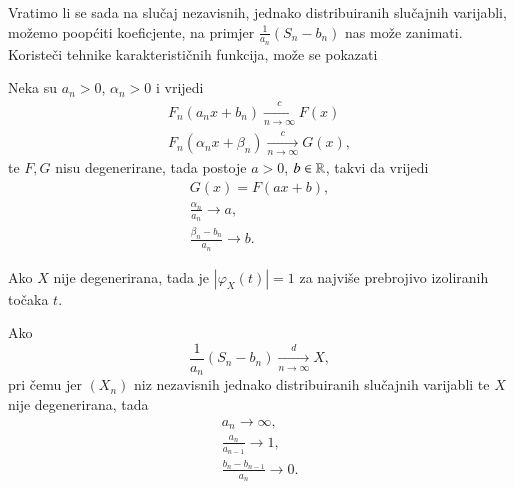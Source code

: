 Vratimo li se sada na slu\v caj nezavisnih, jednako distribuiranih slu\v cajnih varijabli, mo\v zemo poop\' citi koeficjente, na primjer $\frac{1}{a_n} (S_n - b_n)$ nas mo\v ze zanimati.
Koriste\v ci tehnike karakteristi\v cnih funkcija, mo\v ze se pokazati

\begin{zad} \label{zad:19.14}
    Neka su $a_n > 0$, $\alpha_n > 0$ i vrijedi
    \begin{equation*}
        \begin{aligned}
            F_n (a_n x + b_n) \xrightarrow[n \to \infty]{c} F(x)\\
            F_n (\alpha_n x + \beta_n) \xrightarrow[n \to \infty]{c} G(x),
        \end{aligned}
    \end{equation*}
    te $F, G$ nisu degenerirane, tada postoje $a > 0$, $b \in \mathbb{R}$, takvi da vrijedi
    \begin{equation*}
        \begin{gathered}
            G(x) = F(ax + b),\\
            \frac{\alpha_n}{a_n} \to a,\\
            \frac{\beta_n - b_n}{a_n} \to b.
        \end{gathered}
    \end{equation*}
\end{zad}

\begin{zad} \label{zad:19.15}
    Ako $X$ nije degenerirana, tada je $|\varphi_X (t)| = 1$ za najvi\v se prebrojivo izoliranih to\v caka $t$.
\end{zad}

\begin{tm}  \label{tm:19.16}
    Ako
    \begin{equation*}
        \frac{1}{a_n} (S_n - b_n) \xrightarrow[n \to \infty]{d} X,
    \end{equation*}
    pri \v cemu jer $(X_n)$ niz nezavisnih jednako distribuiranih slu\v cajnih varijabli te $X$ nije degenerirana, tada
    \begin{equation*}
        \begin{gathered}
            a_n \to \infty,\\
            \frac{a_n}{a_{n - 1}} \to 1,\\
            \frac{b_n - b_{n - 1}}{a_n} \to 0.
        \end{gathered}
    \end{equation*}
\end{tm}

